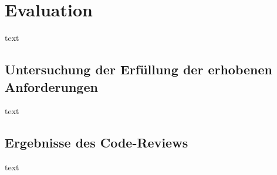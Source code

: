 \section{Evaluation}
text

\subsection{Untersuchung der Erfüllung der erhobenen Anforderungen}
text
\subsection{Ergebnisse des Code-Reviews}
text